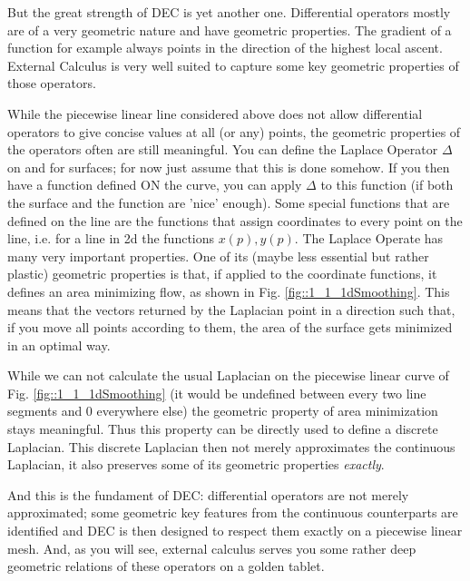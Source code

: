 But the great strength of DEC is yet another one. Differential operators mostly are of a very geometric nature and have geometric properties. The gradient of a function for example always points in the direction of the highest local ascent. External Calculus is very well suited to capture some key geometric properties of those operators. 

While the piecewise linear line considered above does not allow differential operators to give concise values at all (or any) points, the geometric properties of the operators often are still meaningful. 
You can define the Laplace Operator $\Delta$ on and for surfaces; for now just assume that this is done somehow. If you then have a function defined ON the curve, you can apply $\Delta$ to this function (if both the surface and the function are 'nice' enough).  Some special functions that are defined on the line are the functions that assign coordinates to every point on the line, i.e. for a line in 2d the functions $x(p), y(p)$. 
The Laplace Operate has many very important properties. One of its (maybe less essential but rather plastic) geometric properties is that, if applied to the coordinate functions, it defines an area minimizing flow, as shown in Fig. \ref{fig::1_1_1dSmoothing}. This means that the vectors returned by the Laplacian point in a direction such that, if you move all points according to them, the area of the surface gets minimized in an optimal way.

While we can not calculate the usual Laplacian on the piecewise linear curve of Fig. \ref{fig::1_1_1dSmoothing} (it would be undefined between every two line segments and 0 everywhere else) the geometric property of area minimization stays meaningful. Thus this property can be directly used to define a discrete Laplacian. This discrete Laplacian then not merely approximates the continuous Laplacian, it also preserves some of its geometric properties \emph{exactly}.

And this is the fundament of DEC: differential operators are not merely approximated; some geometric key features from the continuous counterparts are identified and DEC is then designed to respect them exactly on a piecewise linear mesh. And, as you will see, external calculus serves you some rather deep geometric relations of these operators on a golden tablet.



